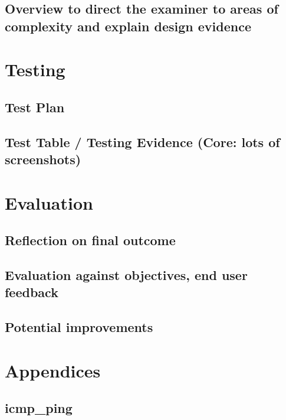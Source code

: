 \documentclass[titlepage]{article}
\let\Oldsection\section{}
\renewcommand{\section}{\FloatBarrier\Oldsection}
\let\Oldsubsection\subsection{}
\renewcommand{\subsection}{\FloatBarrier\Oldsubsection}
\begin{document}
\subsection{Overview to direct the examiner to areas of complexity and explain design evidence}

\section{Testing}

\subsection{Test Plan}

\subsection{Test Table / Testing Evidence (Core: lots of screenshots)}

\section{Evaluation}

\subsection{Reflection on final outcome}

\subsection{Evaluation against objectives, end user feedback}

\subsection{Potential improvements}

\section{Appendices}
\lstset{language=python}

\subsection{icmp\_ping}


\end{document}
